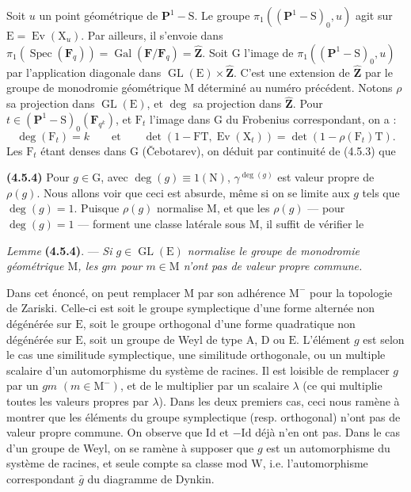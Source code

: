 \documentclass[11pt,leqno]{article}
\begin{document}
Soit \(u\) un point géométrique de \(\mathbf{P}^1-\mathrm{S}\). Le groupe \(\pi_1((\mathbf{P}^1-\mathrm{S})_0,u)\) agit sur \(\mathrm{E}=\operatorname{Ev}(\mathrm{X}_u)\). Par ailleurs, il s’envoie dans \(\pi_1(\operatorname{Spec}(\mathbf{F}_q))=\operatorname{Gal}(\mathbf{F}/\mathbf{F}_q)=\widehat{\mathbf{Z}}\). Soit \(\mathrm{G}\) l’image de \(\pi_1((\mathbf{P}^1-\mathrm{S})_0,u)\) par l’application diagonale dans \(\operatorname{GL}(\mathrm{E})\times\widehat{\mathbf{Z}}\). C’est une extension de \(\widehat{\mathbf{Z}}\) par le groupe de monodromie géométrique \(\mathrm{M}\) déterminé au numéro précédent. Notons \(\rho\) sa projection dans \(\operatorname{GL}(\mathrm{E})\), et \(\deg\) sa projection dans \(\widehat{\mathbf{Z}}\). Pour \(t\in(\mathbf{P}^1-\mathrm{S})_0(\mathbf{F}_{q^k})\), et \(\mathrm{F}_t\) l’image dans \(\mathrm{G}\) du Frobenius correspondant, on a :
\[
\deg(\mathrm{F}_t)=k
\qquad\text{et}\qquad
\det(1-\mathrm{F}\mathrm{T},\operatorname{Ev}(\mathrm{X}_t))
=\det(1-\rho(\mathrm{F}_t)\mathrm{T}).
\]
Les \(\mathrm{F}_t\) étant denses dans \(\mathrm{G}\) (\v{C}ebotarev), on déduit par continuité de (4.5.3) que

\textbf{(4.5.4)} Pour \(g\in\mathrm{G}\), avec \(\deg(g)\equiv1(\mathrm{N})\), \(\gamma^{\deg(g)}\) est valeur propre de \(\rho(g)\). Nous allons voir que ceci est absurde, même si on se limite aux \(g\) tels que \(\deg(g)=1\). Puisque \(\rho(g)\) normalise \(\mathrm{M}\), et que les \(\rho(g)\) — pour \(\deg(g)=1\) — forment une classe latérale sous \(\mathrm{M}\), il suffit de vérifier le

\textit{Lemme} \textbf{(4.5.4)}. — \textit{Si \(g\in\operatorname{GL}(\mathrm{E})\) normalise le groupe de monodromie géométrique \(\mathrm{M}\), les \(gm\) pour \(m\in\mathrm{M}\) n’ont pas de valeur propre commune.}

Dans cet énoncé, on peut remplacer \(\mathrm{M}\) par son adhérence \(\mathrm{M}^{-}\) pour la topologie de Zariski. Celle-ci est soit le groupe symplectique d’une forme alternée non dégénérée sur \(\mathrm{E}\), soit le groupe orthogonal d’une forme quadratique non dégénérée sur \(\mathrm{E}\), soit un groupe de Weyl de type \(\mathrm{A}\), \(\mathrm{D}\) ou \(\mathrm{E}\). L’élément \(g\) est selon le cas une similitude symplectique, une similitude orthogonale, ou un multiple scalaire d’un automorphisme du système de racines. Il est loisible de remplacer \(g\) par un \(gm\) \((m\in\mathrm{M}^{-})\), et de le multiplier par un scalaire \(\lambda\) (ce qui multiplie toutes les valeurs propres par \(\lambda\)). Dans les deux premiers cas, ceci nous ramène à montrer que les éléments du groupe symplectique (resp. orthogonal) n’ont pas de valeur propre commune. On observe que \(\mathrm{Id}\) et \(-\mathrm{Id}\) déjà n’en ont pas. Dans le cas d’un groupe de Weyl, on se ramène à supposer que \(g\) est un automorphisme du système de racines, et seule compte sa classe mod \(\mathrm{W}\), i.e. l’automorphisme correspondant \(\bar{g}\) du diagramme de Dynkin.
\end{document}
